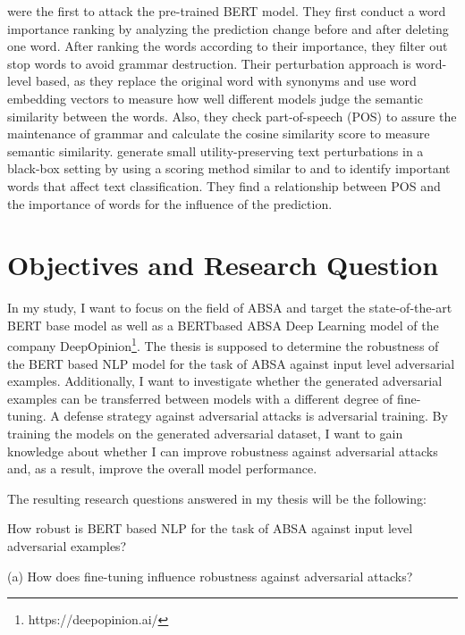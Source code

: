 \cite{jin2019bert} were the first to attack the pre-trained BERT model. They first conduct a word importance ranking by analyzing the prediction change before and after deleting one word. After ranking the words according to their importance, they filter out stop words to avoid grammar destruction. Their perturbation approach is word-level based, as they replace the original word with synonyms and use word embedding vectors to measure how well different models judge the semantic similarity between the words. Also, they check part-of-speech (POS) to assure the maintenance of grammar and calculate the cosine similarity score to measure semantic similarity. \cite{goodman2020fastwordbug} generate small utility-preserving text perturbations in a black-box setting by using a scoring method similar to \cite{gao2018black} and \cite{jin2019bert} to identify important words that affect text classification. They find a relationship between POS and the importance of words for the influence of the prediction. 

\section{Objectives and Research Question}

In my study, I want to focus on the field of ABSA and target the state-of-the-art BERT base model as well as a BERTbased ABSA Deep Learning model of the company DeepOpinion\footnote{https://deepopinion.ai/}. The thesis is supposed to determine the robustness of the BERT based NLP model for the task of ABSA against input level adversarial examples.
Additionally, I want to investigate whether the generated adversarial examples can be transferred between models with a different degree of fine-tuning. A defense strategy against adversarial attacks is adversarial training. By training the models on the generated adversarial dataset, I want to gain knowledge about whether I can improve robustness against adversarial attacks and, as a result, improve the overall model performance.

The resulting research questions answered in my thesis will be the following:

How robust is BERT based NLP for the task of ABSA against input level adversarial examples?

(a) How does fine-tuning influence robustness against adversarial attacks?

